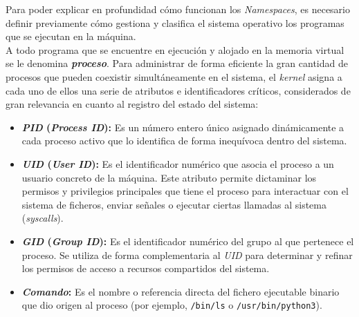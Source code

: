 Para poder explicar en profundidad cómo funcionan los \textit{Namespaces}, es necesario definir previamente cómo gestiona y clasifica el sistema operativo los programas que se ejecutan en la máquina.\\

A todo programa que se encuentre en ejecución y alojado en la memoria virtual se le denomina \textbf{\textit{proceso}}.
Para administrar de forma eficiente la gran cantidad de procesos que pueden coexistir simultáneamente en el sistema, el \textit{kernel} asigna a cada uno de ellos una serie de atributos e identificadores críticos, considerados de gran relevancia en cuanto al registro del estado del sistema:

\begin{itemize}
    \item \textbf{\textit{PID} (\textit{Process ID}):} Es un número entero único asignado dinámicamente a cada proceso activo que lo identifica de forma inequívoca dentro del sistema.
    \item \textbf{\textit{UID} (\textit{User ID}):} Es el identificador numérico que asocia el proceso a un usuario concreto de la máquina. Este atributo permite dictaminar los permisos y privilegios principales que tiene el proceso para interactuar con el sistema de ficheros, enviar señales o ejecutar ciertas llamadas al sistema (\textit{syscalls}).
    \item \textbf{\textit{GID} (\textit{Group ID}):} Es el identificador numérico del grupo al que pertenece el proceso. Se utiliza de forma complementaria al \textit{UID} para determinar y refinar los permisos de acceso a recursos compartidos del sistema.
    \item \textbf{\textit{Comando}:} Es el nombre o referencia directa del fichero ejecutable binario que dio origen al proceso (por ejemplo, \texttt{/bin/ls} o \texttt{/usr/bin/python3}).
\end{itemize}

